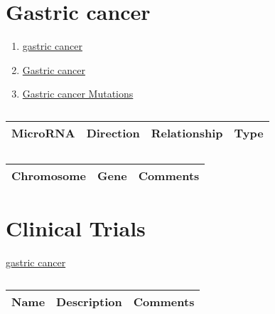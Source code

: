 \section{Gastric cancer}

\begin{enumerate}
\item \href{https://www.omim.org/entry/133239?search=gastric%20cancer&highlight=%28cancer%7Ccancerous%29%20gastric}{gastric cancer}
\item \href{https://www.malacards.org/card/gastric_cancer}{Gastric cancer}
\item \href{https://cancer.sanger.ac.uk/cosmic/search?q=gastric+cancer}{Gastric cancer Mutations}
\end{enumerate}

\begin{table}[H]\centering
  \caption {\cite{key400} \cite{480}}
	\begin{tabular}{p{1cm}p{4cm}p{3cm}}
		 MicroRNA & Direction & Relationship & Type\\
		\hline
		
	\end{tabular}
\end{table}




\begin{table}[H]\centering
  \caption {\cite{key450}}
	\begin{tabular}{p{1cm}p{4cm}p{3cm}}
		Chromosome & Gene & Comments\\
		\hline

		\hline
	\end{tabular}
\end{table}


\section{Clinical Trials}

\href{https://clinicaltrials.gov/ct2/results?cond=gastric+cancer&term=&cntry=&state=&city=&dist=}{gastric cancer}

\begin{table}[H]\centering
  \caption {\cite{key460}}
	\begin{tabular}{p{1cm}p{4cm}p{3cm}}
		Name & Description & Comments\\
		\hline
		\hline
	\end{tabular}
\end{table}

